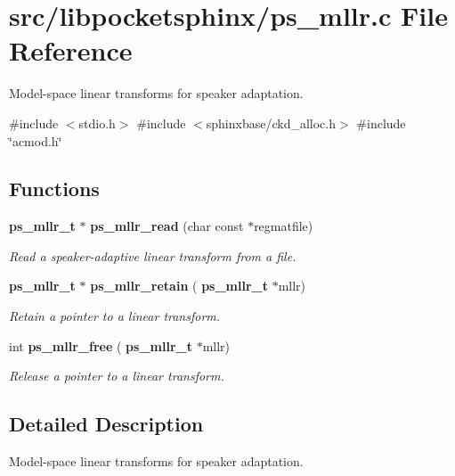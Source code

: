 \section{src/libpocketsphinx/ps\+\_\+mllr.c File Reference}
\label{ps__mllr_8c}


Model-\/space linear transforms for speaker adaptation.  


{\ttfamily \#include $<$stdio.\+h$>$}\newline
{\ttfamily \#include $<$sphinxbase/ckd\+\_\+alloc.\+h$>$}\newline
{\ttfamily \#include \char`\"{}acmod.\+h\char`\"{}}\newline
\subsection*{Functions}
\begin{DoxyCompactItemize}
\item 
\mbox{\label{ps__mllr_8c_ab62fb9c8cf3bdeed75a7ac2870d56a5a}} 
\textbf{ ps\+\_\+mllr\+\_\+t} $\ast$ \textbf{ ps\+\_\+mllr\+\_\+read} (char const $\ast$regmatfile)
\begin{DoxyCompactList}\small\item\em Read a speaker-\/adaptive linear transform from a file. \end{DoxyCompactList}\item 
\mbox{\label{ps__mllr_8c_ae21e7d8a0fa751aaccc5ef39dc5d1fe0}} 
\textbf{ ps\+\_\+mllr\+\_\+t} $\ast$ \textbf{ ps\+\_\+mllr\+\_\+retain} (\textbf{ ps\+\_\+mllr\+\_\+t} $\ast$mllr)
\begin{DoxyCompactList}\small\item\em Retain a pointer to a linear transform. \end{DoxyCompactList}\item 
\mbox{\label{ps__mllr_8c_a240194a6ef30b01da38e3654c984b017}} 
int \textbf{ ps\+\_\+mllr\+\_\+free} (\textbf{ ps\+\_\+mllr\+\_\+t} $\ast$mllr)
\begin{DoxyCompactList}\small\item\em Release a pointer to a linear transform. \end{DoxyCompactList}\end{DoxyCompactItemize}


\subsection{Detailed Description}
Model-\/space linear transforms for speaker adaptation. 

